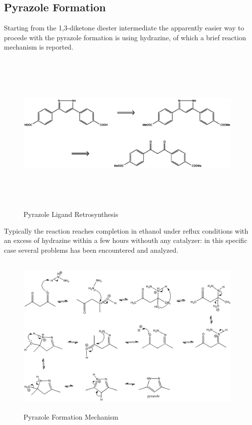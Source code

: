 \documentclass[../Master.tex]{subfiles}
\begin{document}
\subsection{Pyrazole Formation}\label{sec:pyrazole-reaction}
Starting from the 1,3-diketone diester intermediate the apparently easier way to procede with the pyrazole formation is using hydrazine, of which a brief reaction mechanism is reported.

\begin{figure}[h!]
	\centering
	\includegraphics[width=16cm,height=8cm,keepaspectratio]{Structures/pyrazole-retro.eps}
	\caption{Pyrazole Ligand Retrosynthesis}\label{fig:pyrazole-retro}
\end{figure}
Typically the reaction reaches completion in ethanol under reflux conditions with an excess of hydrazine within a few hours withouth any catalyzer: in this specific case several problems has been encountered and analyzed.

\begin{figure}[h!]
	\centering
	\includegraphics[width=16cm,height=8cm,keepaspectratio]{Images/pyrazole-mechanism.png}
	\caption{Pyrazole Formation Mechanism}
\end{figure}
\end{document}

